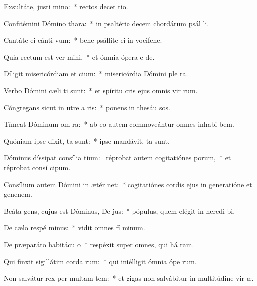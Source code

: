\item Exsultáte, justi  mino:~* rectos decet tio.
\item Confitémini Dómino  thara:~* in psaltério decem chordárum psál li.
\item Cantáte ei cánti vum:~* bene psállite ei in vocifene.
\item Quia rectum est ver mini,~* et ómnia ópera e  de.
\item Díligit misericórdiam et cium:~* misericórdia Dómini ple  ra.
\item Verbo Dómini cæli ti sunt:~* et spíritu oris ejus omnis vir rum.
\item Cóngregans sicut in utre a ris:~* ponens in thesáu sos.
\item Tímeat Dóminum om ra:~* ab eo autem commoveántur omnes inhabi bem.
\item Quóniam ipse dixit,  ta sunt:~* ipse mandávit,  ta sunt.
\item Dóminus díssipat consília tium:~\pscross{} réprobat autem cogitatiónes porum,~* et réprobat consí cipum.
\item Consílium autem Dómini in ætér net:~* cogitatiónes cordis ejus in generatióne et genenem.
\item Beáta gens, cujus est Dóminus, De jus:~* pópulus, quem elégit in heredi bi.
\item De cælo respé minus:~* vidit omnes fí minum.
\item De præparáto habitácu o~* respéxit super omnes, qui há ram.
\item Qui finxit sigillátim corda rum:~* qui intélligit ómnia ópe rum.
\item Non salvátur rex per multam tem:~* et gigas non salvábitur in multitúdine vir æ.
